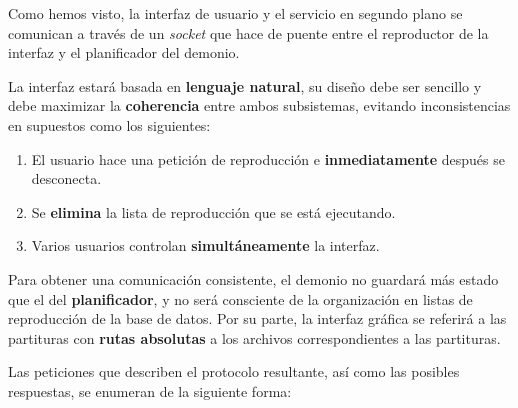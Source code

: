 Como hemos visto, la interfaz de usuario y el servicio en segundo plano se comunican a través de un \textit{socket} que hace de puente entre el reproductor de la interfaz y el planificador del demonio.

La interfaz estará basada en \textbf{lenguaje natural}, su diseño debe ser sencillo y debe maximizar la \textbf{coherencia} entre ambos subsistemas, evitando inconsistencias en supuestos como los siguientes:

\begin{enumerate}
	\item El usuario hace una petición de reproducción e \textbf{inmediatamente} después se desconecta.
	\item Se \textbf{elimina} la lista de reproducción que se está ejecutando.
	\item Varios usuarios controlan \textbf{simultáneamente} la interfaz.
\end{enumerate}

Para obtener una comunicación consistente, el demonio no guardará más estado que el del \textbf{planificador}, y no será consciente de la organización en listas de reproducción de la base de datos. Por su parte, la interfaz gráfica se referirá a las partituras con \textbf{rutas absolutas} a los archivos correspondientes a las partituras.

Las peticiones que describen el protocolo resultante, así como las posibles respuestas, se enumeran de la siguiente forma:

